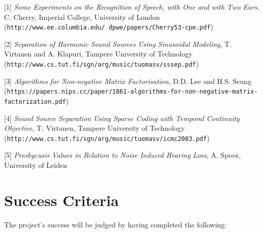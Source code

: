 \documentclass[12pt]{article}
\begin{document}
\begin{description}

\item {[1]} \emph{Some Experiments on the Recognition of Speech, with One and with Two Ears}, C. Cherry, Imperial College, University of London\\
({\tt http://www.ee.columbia.edu/~dpwe/papers/Cherry53-cpe.pdf})

\item {[2]} \emph{Separation of Harmonic Sound Sources Using Sinusoidal Modeling}, T. Virtanen and A. Klapuri, Tampere University of Technology\\
({\tt http://www.cs.tut.fi/sgn/arg/music/tuomasv/sssep.pdf})

\item {[3]} \emph{Algorithms for Non-negative Matrix Factorisation}, D.D. Lee and H.S. Seung\\
({\tt \scriptsize https://papers.nips.cc/paper/1861-algorithms-for-non-negative-matrix-factorization.pdf})

\item {[4]} \emph{Sound Source Separation Using Sparse Coding with Temporal Continuity Objective}, T. Virtanen, Tampere University of Technology\\
({\tt http://www.cs.tut.fi/sgn/arg/music/tuomasv/icmc2003.pdf})

\item {[5]} \emph{Presbycusis Values in Relation to Noise Induced Hearing Loss}, A. Spoor, University of Leiden\\
\end{description}

\section*{Success Criteria}

The project's success will be judged by having completed the following:
\end{document}

